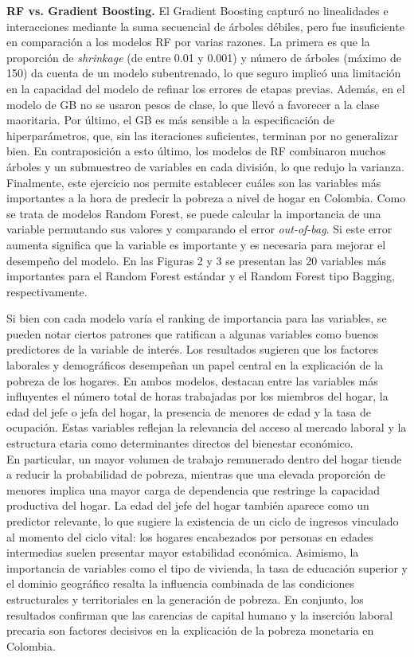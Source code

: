 \documentclass[12pt,a4paper,onecolumn]{article}
\begin{document}
\textbf{RF vs. Gradient Boosting.} El Gradient Boosting capturó no linealidades e interacciones mediante la suma secuencial de árboles débiles, pero fue insuficiente en comparación a los modelos RF por varias razones. La primera es que la proporción de \textit{shrinkage} (de entre 0.01 y 0.001) y número de árboles (máximo de 150) da cuenta de un modelo subentrenado, lo que seguro implicó una limitación en la capacidad del modelo de refinar los errores de etapas previas. Además, en el modelo de GB no se usaron pesos de clase, lo que llevó a favorecer a la clase maoritaria. Por último, el GB es más sensible a la especificación de hiperparámetros, que, sin las iteraciones suficientes, terminan por no generalizar bien. En contraposición a esto último, los modelos de RF combinaron muchos árboles y un submuestreo de variables en cada división, lo que redujo la varianza.\\

Finalmente, este ejercicio nos permite establecer cuáles son las variables más importantes a la hora de predecir la pobreza a nivel de hogar en Colombia. Como se trata de modelos Random Forest, se puede calcular la importancia de una variable permutando sus valores y comparando el error \textit{out-of-bag}. Si este error aumenta significa que la variable es importante y es necesaria para mejorar el desempeño del modelo. En las Figuras 2 y 3 se presentan las 20 variables más importantes para el Random Forest estándar y el Random Forest tipo Bagging, respectivamente.

Si bien con cada modelo varía el ranking de importancia para las variables, se pueden notar ciertos patrones que ratifican a algunas variables como buenos predictores de la variable de interés. Los resultados sugieren que los factores laborales y demográficos desempeñan un papel central en la explicación de la pobreza de los hogares. En ambos modelos, destacan entre las variables más influyentes el número total de horas trabajadas por los miembros del hogar, la edad del jefe o jefa del hogar, la presencia de menores de edad y la tasa de ocupación. Estas variables reflejan la relevancia del acceso al mercado laboral y la estructura etaria como determinantes directos del bienestar económico. \\

En particular, un mayor volumen de trabajo remunerado dentro del hogar tiende a reducir la probabilidad de pobreza, mientras que una elevada proporción de menores implica una mayor carga de dependencia que restringe la capacidad productiva del hogar. La edad del jefe del hogar también aparece como un predictor relevante, lo que sugiere la existencia de un ciclo de ingresos vinculado al momento del ciclo vital: los hogares encabezados por personas en edades intermedias suelen presentar mayor estabilidad económica. Asimismo, la importancia de variables como el tipo de vivienda, la tasa de educación superior y el dominio geográfico resalta la influencia combinada de las condiciones estructurales y territoriales en la generación de pobreza. En conjunto, los resultados confirman que las carencias de capital humano y la inserción laboral precaria son factores decisivos en la explicación de la pobreza monetaria en Colombia.\\
\end{document}
